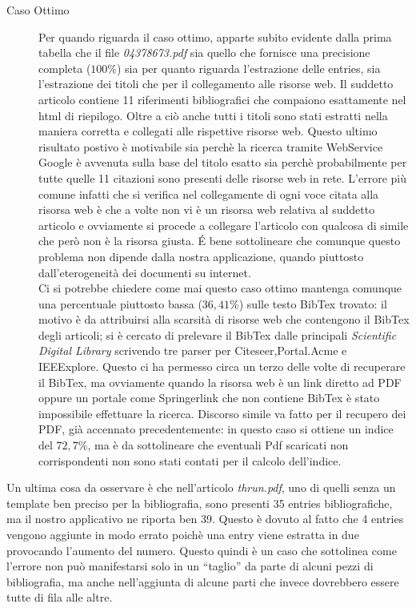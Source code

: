 \begin{description}
	\item[Caso Ottimo] Per quando riguarda il caso ottimo, apparte subito evidente dalla prima tabella che il file \textit{04378673.pdf} sia quello che fornisce una precisione completa ($100\%$) sia per quanto riguarda l'estrazione delle entries, sia l'estrazione dei titoli che per il collegamento alle risorse web. Il suddetto articolo contiene 11 riferimenti bibliografici che compaiono esattamente nel html di riepilogo. Oltre a ciò anche tutti i titoli sono stati estratti nella maniera corretta e collegati alle rispettive risorse web. Questo ultimo risultato postivo è motivabile sia perchè la ricerca tramite WebService Google è avvenuta sulla base del titolo esatto sia perchè probabilmente per tutte quelle 11 citazioni sono presenti delle risorse web in rete. L'errore più comune infatti che si verifica nel collegamente di ogni voce citata alla risorsa web è che a volte non vi è un risorsa web relativa al suddetto articolo e ovviamente si procede a collegare l'articolo con qualcosa di simile che però non è la risorsa giusta. \'E bene sottolineare che comunque questo problema non dipende dalla nostra applicazione, quando piuttosto dall'eterogeneità dei documenti su internet.\\

Ci si potrebbe chiedere come mai questo caso ottimo mantenga comunque una percentuale piuttosto bassa ($36,41\%$) sulle testo BibTex trovato: il motivo è da attribuirsi alla scarsità di risorse web che contengono il BibTex degli articoli; si è cercato di prelevare il BibTex dalle principali \textit{Scientific Digital Library} scrivendo tre parser per Citeseer,Portal.Acme e IEEExplore. Questo ci ha permesso circa un terzo delle volte di recuperare il BibTex, ma ovviamente quando la risorsa web è un link diretto ad PDF oppure un portale come Springerlink che non contiene BibTex è stato impossibile effettuare la ricerca. Discorso simile va fatto per il recupero dei PDF, già accennato precedentemente: in questo caso si ottiene un indice del $72,7\%$, ma è da sottolineare che eventuali Pdf scaricati non corrispondenti non sono stati contati per il calcolo dell'indice.
\end{description}

Un ultima cosa da osservare è che nell'articolo \textit{thrun.pdf}, uno di quelli senza un template ben preciso per la bibliografia, sono presenti 35 entries bibliografiche, ma il nostro applicativo ne riporta ben 39. Questo è dovuto al fatto che 4 entries vengono aggiunte in modo errato poichè una entry viene estratta in due provocando l'aumento del numero. Questo quindi è un caso che sottolinea come l'errore non può manifestarsi solo in un ``taglio'' da parte di alcuni pezzi di bibliografia, ma anche nell'aggiunta di alcune parti che invece dovrebbero essere tutte di fila alle altre.


